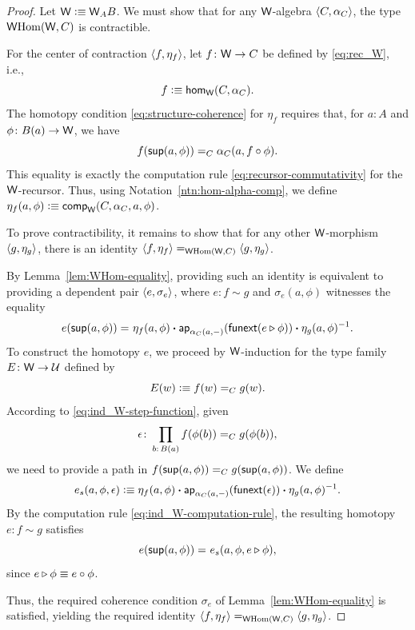 \begin{proof}
    Let $\mathsf{W}\mathrel{\vcentcolon}\equiv\mathsf{W}_AB$. We must show that for any $\mathsf{W}$-algebra $\langle C,\alpha_C\rangle$, the type $\mathsf{W}{\operatorname{Hom}}(\mathsf{W},C)$ is contractible. 
    
    For the center of contraction $\langle f,\eta_f\rangle$, let $f\colon\fun W\to C$ be defined by \eqref{eq:rec_W}, i.e.,
    \[
        f\mathrel{\vcentcolon}\equiv\mathsf{hom}_{\mathsf{W}}(C,\alpha_C).
    \]
    The homotopy condition \eqref{eq:structure-coherence} for $\eta_f$ requires that, for $a\colon A$ and $\phi\colon B(a)\to\fun W$, we have
    \[
        f(\mathsf{sup}(a,\phi))\mathrel{=_{C}}\alpha_C(a,f\circ\phi).
    \]
    This equality is exactly the computation rule \eqref{eq:recursor-commutativity} for the $\mathsf{W}$-recursor. Thus, using Notation~\ref{ntn:hom-alpha-comp}, we define $\eta_f(a,\phi)\mathrel{\vcentcolon}\equiv\mathsf{comp}_{\mathsf{W}}(C,\alpha_C,a,\phi)$.

    To prove contractibility, it remains to show that for any other $\mathsf{W}$-morphism $\langle g,\eta_g\rangle$, there is an identity $\langle f,\eta_f\rangle\mathrel{=_{\mathsf{W}{\operatorname{Hom}}(\mathsf{W},C)}}\langle g,\eta_g\rangle$. 
    
    By Lemma~\ref{lem:WHom-equality}, providing such an identity is equivalent to providing a dependent pair $\langle e,\sigma_e\rangle$, where $e\colon f\sim g$ and $\sigma_e(a,\phi)$ witnesses the equality
    \[
        e(\mathsf{sup}(a,\phi))\mathrel{=_{}}
        \eta_f(a,\phi)
        \mathbin{\boldsymbol{\cdot}}\mathsf{ap}_{\alpha_C(a,{\mathord-})}
            (\mathsf{funext}(e\triangleright\phi))
        \mathbin{\boldsymbol{\cdot}} \eta_g(a,\phi)^{-1}.
    \]
    To construct the homotopy $e$, we proceed by $\mathsf{W}$-induction for the type family $E\colon\fun W\to\univ$ defined by
    \[
        E(w)\mathrel{\vcentcolon}\equiv f(w)\mathrel{=_{C}}g(w).
    \]
    According to \eqref{eq:ind_W-step-function}, given
    \[
        \epsilon\colon\prod_{b\colon B(a)}
            f(\phi(b))\eq Cg(\phi(b)),
    \]
    we need to provide a path in $f(\mathsf{sup}(a,\phi))\mathrel{=_{C}}g(\mathsf{sup}(a,\phi))$. We define
    \[
        e_s(a,\phi,\epsilon)\mathrel{\vcentcolon}\equiv
            \eta_f(a,\phi)
            \mathbin{\boldsymbol{\cdot}}\mathsf{ap}_{\alpha_C(a,{\mathord-})}
                (\mathsf{funext}(\epsilon))
            \mathbin{\boldsymbol{\cdot}}\eta_g(a,\phi)^{-1}.
    \]
    By the computation rule \eqref{eq:ind_W-computation-rule}, the resulting homotopy $e\colon f\sim g$ satisfies
    \[
        e(\mathsf{sup}(a,\phi))\mathrel{=_{}}e_s(a,\phi,e\triangleright\phi),
    \]
    since $e\triangleright\phi\equiv e\circ\phi$.
    
    Thus, the required coherence condition $\sigma_e$ of Lemma~\ref{lem:WHom-equality} is satisfied, yielding the required identity $\langle f,\eta_f\rangle\mathrel{=_{\mathsf{W}{\operatorname{Hom}}(\mathsf{W},C)}}\langle g,\eta_g\rangle$.
    
\end{proof}

